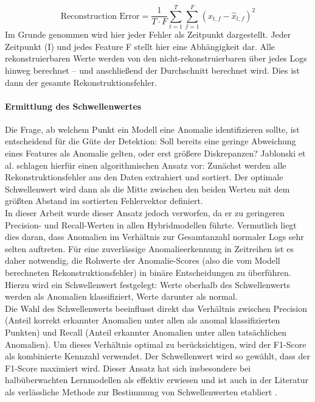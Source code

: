\documentclass[a4paper,12pt]{article}
\begin{document}
	\[
	\text{Reconstruction Error} = \frac{1}{T \cdot F} \sum_{t=1}^{T} \sum_{f=1}^{F} \left( x_{t,f} - \hat{x}_{t,f} \right)^2
	\]
	Im Grunde genommen wird hier jeder Fehler als Zeitpunkt dargestellt. Jeder Zeitpunkt (I) und jedes Feature F stellt hier eine Abhängigkeit dar. Alle rekonstruierbaren Werte werden von den nicht-rekonstruierbaren über jedes Logs hinweg berechnet – und anschließend der Durchschnitt berechnet wird. Dies ist dann der gesamte Rekonstruktionsfehler.
	
	\paragraph{Ermittlung des Schwellenwertes}
	Die Frage, ab welchem Punkt ein Modell eine Anomalie identifizieren sollte, ist entscheidend für die Güte der Detektion: Soll bereits eine geringe Abweichung eines Features als Anomalie gelten, oder erst größere Diskrepanzen? Jablonski et al. \cite{jablonski2023automatic} schlagen hierfür einen algorithmischen Ansatz vor: Zunächst werden alle Rekonstruktionsfehler aus den Daten extrahiert und sortiert. Der optimale Schwellenwert wird dann als die Mitte zwischen den beiden Werten mit dem größten Abstand im sortierten Fehlervektor definiert.
	\\[0.5em]
	In dieser Arbeit wurde dieser Ansatz jedoch verworfen, da er zu geringeren Precision- und Recall-Werten in allen Hybridmodellen führte. Vermutlich liegt dies daran, dass Anomalien im Verhältnis zur Gesamtanzahl normaler Logs sehr selten auftreten. Für eine zuverlässige Anomalieerkennung in Zeitreihen ist es daher notwendig, die Rohwerte der Anomalie-Scores (also die vom Modell berechneten Rekonstruktionsfehler) in binäre Entscheidungen zu überführen. Hierzu wird ein Schwellenwert festgelegt: Werte oberhalb des Schwellenwerts werden als Anomalien klassifiziert, Werte darunter als normal.
	\\[0.5em]
	Die Wahl des Schwellenwerts beeinflusst direkt das Verhältnis zwischen Precision (Anteil korrekt erkannter Anomalien unter allen als anomal klassifizierten Punkten) und Recall (Anteil erkannter Anomalien unter allen tatsächlichen Anomalien). Um dieses Verhältnis optimal zu berücksichtigen, wird der F1-Score als kombinierte Kennzahl verwendet. Der Schwellenwert wird so gewählt, dass der F1-Score maximiert wird. Dieser Ansatz hat sich insbesondere bei halbüberwachten Lernmodellen als effektiv erwiesen und ist auch in der Literatur als verlässliche Methode zur Bestimmung von Schwellenwerten etabliert \cite{wilkinghoff2024f1ev}.
	
\end{document}
